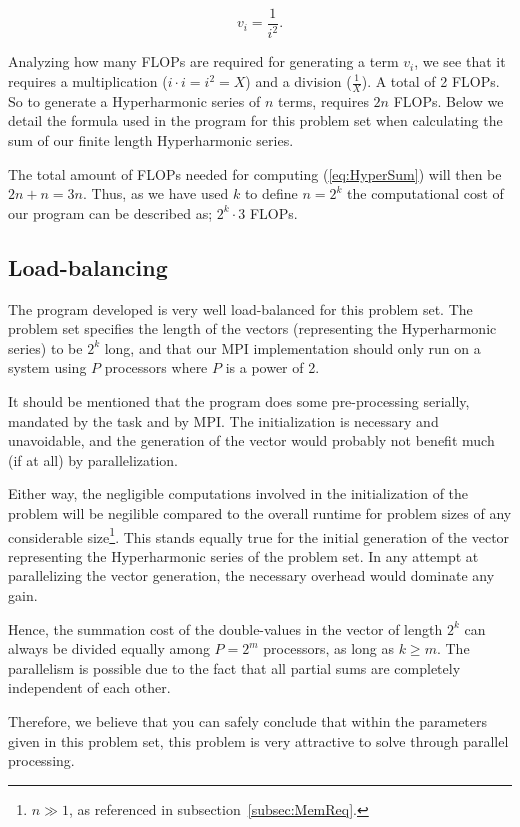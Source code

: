 \documentclass[fontsize=11pt,paper=a4,titlepage]{report}
\begin{document}
\begin{equation}
	v_i = \frac{1}{i^2}.
\end{equation}

Analyzing how many FLOPs are required for generating a term $v_i$, we see that
it requires a multiplication ($i\cdot i = i^2 = X$) and a division
($\frac{1}{X}$). A total of 2 FLOPs. So to generate a Hyperharmonic series of
$n$ terms, requires $2n$ FLOPs. Below we detail the formula used in the program
for this problem set when calculating the sum of our finite length Hyperharmonic
series.

The total amount of FLOPs needed for computing (\ref{eq:HyperSum}) will then be
$2n + n = 3n$. Thus, as we have used $k$ to define $n=2^k$ the computational
cost of our program can be described as; $2^k\cdot 3$ FLOPs.

\subsection{Load-balancing}

The program developed is very well load-balanced for this problem set. The
problem set specifies the length of the vectors (representing the Hyperharmonic
series) to be $2^k$ long, and that our MPI implementation should only run on a
system using $P$ processors where $P$ is a power of 2.

It should be mentioned that the program does some pre-processing serially,
mandated by the task and by MPI. The initialization is necessary and
unavoidable, and the generation of the vector would probably not benefit much
(if at all) by parallelization.

Either way, the negligible computations involved in the initialization of the
problem will be negilible compared to the overall  runtime for problem sizes of
any considerable size\footnote{$n \gg 1$, as  referenced in
subsection~\ref{subsec:MemReq}.}. This stands equally true for the  initial
generation of the vector representing the Hyperharmonic series of the problem
set. In any attempt at parallelizing the vector generation, the  necessary
overhead would dominate any gain.

Hence, the summation cost of the double-values in the vector of length $2^k$ can
always be divided equally among $P = 2^m$ processors, as long as $k\geq m$. The
parallelism is possible due to the fact that all partial sums are completely
independent of each other. \newline

Therefore, we believe that you can safely conclude that within the parameters
given in this problem set, this problem is very attractive to solve through
parallel processing.
\end{document}
